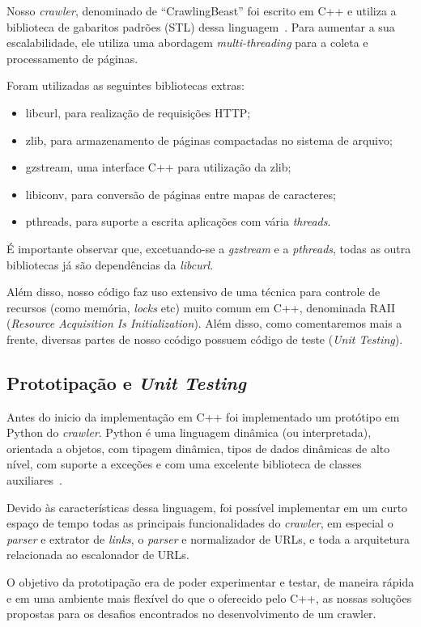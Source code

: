 \documentclass[10pt,twocolumn]{article}
\begin{document}
Nosso \emph{crawler}, denominado de ``CrawlingBeast'' foi escrito em C++
e utiliza a biblioteca de gabaritos padrões (STL) dessa
linguagem~\cite{stroustrup97}. Para aumentar a sua escalabilidade, ele
utiliza uma abordagem \emph{multi-threading} para a coleta e
processamento de páginas.

Foram utilizadas as seguintes bibliotecas extras:
\begin{itemize}
\item libcurl, para realização de requisições HTTP;
\item zlib, para armazenamento de páginas compactadas no sistema de
arquivo;
\item gzstream, uma interface C++ para utilização da zlib;
\item libiconv, para conversão de páginas entre mapas de caracteres;
\item pthreads, para suporte a escrita aplicações com vária
\emph{threads}.
\end{itemize}

É importante observar que, excetuando-se a \emph{gzstream} e a
\emph{pthreads}, todas as outra bibliotecas já são dependências da
\emph{libcurl}.

Além disso, nosso código faz uso extensivo de uma técnica para controle
de recursos (como memória, \emph{locks} etc)  muito comum em C++,
denominada RAII (\emph{Resource Acquisition Is Initialization}).
Além disso, como comentaremos mais a frente, diversas partes de nosso
ccódigo possuem código de teste (\emph{Unit Testing}).

\subsection{Prototipação e \emph{Unit Testing}}

Antes do inicio da implementação em C++ foi implementado um protótipo em
Python do \emph{crawler}. Python é uma linguagem dinâmica (ou
interpretada), orientada a objetos, com tipagem dinâmica, tipos de dados
dinâmicas de alto nível, com suporte a exceções e com uma excelente
biblioteca de classes auxiliares~\cite{pythonlang}.

Devido às características dessa linguagem, foi possível implementar em
um curto espaço de tempo todas as principais funcionalidades do
\emph{crawler}, em especial o \emph{parser} e extrator de \emph{links},
o \emph{parser} e normalizador de URLs, e toda a arquitetura relacionada
ao escalonador de URLs.

O objetivo da prototipação era de poder experimentar e testar, de
maneira rápida e em uma ambiente mais flexível do que o oferecido pelo
C++, as nossas soluções propostas para os desafios encontrados no
desenvolvimento de um crawler.
\end{document}
